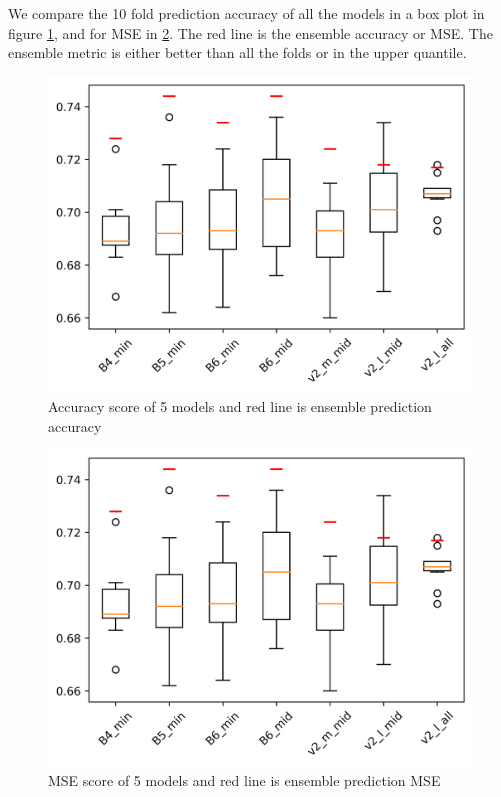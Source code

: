 \documentclass[10pt,letterpaper]{article}
\begin{document}
We compare the 10 fold prediction accuracy of all the models in a box plot in
figure \ref{marker4}, and for MSE in \ref{marker5}. The red line 
is the ensemble accuracy or MSE. The ensemble metric is either better than 
all the folds or in the upper quantile.

\begin{figure}[h!]
  \centering
  \begin{minipage}[b]{0.49\textwidth}
  \includegraphics[scale=0.2]{results/box_plot_models_acc.png}
    \caption{Accuracy score of 5 models and red line is ensemble prediction accuracy}
   \label{marker4}
  \end{minipage}
  \hfill
\end{figure}

\begin{figure}[h!]
  \centering
  \begin{minipage}[b]{0.49\textwidth}
  \includegraphics[scale=0.2]{results/box_plot_models_acc.png}
    \caption{MSE score of 5 models and red line is ensemble prediction MSE}
   \label{marker5}
  \end{minipage}
  \hfill
\end{figure}
\end{document}
